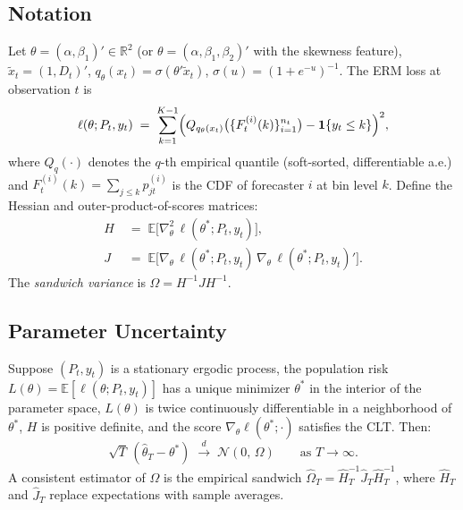 \subsection*{Notation}

Let $\theta = (\alpha, \beta_1)' \in \mathbb{R}^{2}$ (or $\theta = (\alpha,\beta_1,\beta_2)'$
with the skewness feature), $\tilde x_t = (1, D_t)'$, $q_\theta(x_t) = \sigma(\theta' \tilde x_t)$,
$\sigma(u) = (1 + e^{-u})^{-1}$.
The ERM loss at observation $t$ is
\begin{equation}
  \ell(\theta; P_t, y_t)
    \;=\; \sum_{k=1}^{K-1}
    \Bigl(Q_{q_\theta(x_t)}\bigl(\{F^{(i)}_t(k)\}_{i=1}^{n_t}\bigr) - \mathbf{1}\{y_t \leq k\}\Bigr)^2,
\end{equation}
where $Q_q(\cdot)$ denotes the $q$-th empirical quantile (soft-sorted, differentiable a.e.)
and $F^{(i)}_t(k) = \sum_{j \leq k} p^{(i)}_{jt}$ is the CDF of forecaster $i$ at bin level $k$.
Define the Hessian and outer-product-of-scores matrices:
\begin{align}
  H &\;=\; \mathbb{E}\bigl[\nabla^2_\theta\, \ell(\theta^*; P_t, y_t)\bigr], \\
  J &\;=\; \mathbb{E}\bigl[\nabla_\theta\, \ell(\theta^*; P_t, y_t)\,
           \nabla_\theta\, \ell(\theta^*; P_t, y_t)'\bigr].
\end{align}
The \emph{sandwich variance} is $\Omega = H^{-1} J H^{-1}$.

\subsection*{Parameter Uncertainty}

\begin{proposition}
\label{prop:qlevel_asymptotics}
Suppose $(P_t, y_t)$ is a stationary ergodic process, the population risk
$L(\theta) = \mathbb{E}[\ell(\theta; P_t, y_t)]$ has a unique minimizer $\theta^*$
in the interior of the parameter space, $L(\theta)$ is twice continuously
differentiable in a neighborhood of $\theta^*$, $H$ is positive definite, and
the score $\nabla_\theta \ell(\theta^*; \cdot)$ satisfies the CLT.
Then:
\begin{equation}
  \sqrt{T}\,(\hat\theta_T - \theta^*)
    \;\xrightarrow{d}\; \mathcal{N}(0,\, \Omega)
  \qquad \text{as } T \to \infty.
\end{equation}
A consistent estimator of $\Omega$ is the empirical sandwich
$\hat\Omega_T = \hat H_T^{-1} \hat J_T \hat H_T^{-1}$,
where $\hat H_T$ and $\hat J_T$ replace expectations with sample averages.
\end{proposition}


